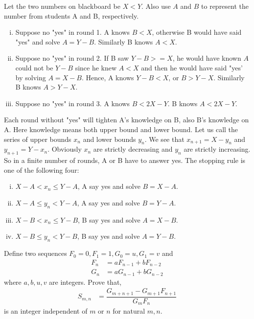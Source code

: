 \documentclass{subfile}
\begin{document}
	\begin{solution}
		Let the two numbers on blackboard be $ X<Y$. Also use $ A$ and $ B$ to represent the number from students A and B, respectively.
			\begin{enumerate}[i.]
				\item Suppose no "yes" in round 1. A knows $ B<X$, otherwise B would have said "yes" and solve $ A=Y-B$. Similarly B knows $ A<X$.
				\item Suppose no "yes" in round 2. If B saw $ Y-B>=X$, he would have known $ A$ could not be $ Y-B$ since he knew $ A<X$ and then he would have said "yes' by solving $ A=X-B$. Hence, A knows $ Y-B<X$, or $ B>Y-X$. Similarly B knows $ A>Y-X$.
				\item Suppose no "yes" in round 3. A knows $ B<2X-Y$. B knows $ A<2X-Y$.
			\end{enumerate}
		Each round without "yes" will tighten A's knowledge on B, also B's knowledge on A. Here knowledge means both upper bound and lower bound. Let us call the series of upper bounds $ x_n$ and lower bounds $ y_n$. We see that $ x_{n+1}=X-y_n$ and $ y_{n+1}=Y-x_n$. Obviously $ x_n$ are strictly decreasing and $ y_n$ are strictly increasing. So in a finite number of rounds, A or B have to answer yes. The stopping rule is one of the following four:
			\begin{enumerate}[i.]
				\item $ X-A<x_n\leq Y-A$, A say yes and solve $ B=X-A$.
				\item $ X-A\leq y_n<Y-A$, A say yes and solve $ B=Y-A$.
				\item $ X-B<x_n\leq Y-B$, B say yes and solve $ A=X-B$.
				\item $ X-B\leq y_n<Y-B$, B say yes and solve $ A=Y-B$.
			\end{enumerate}
	\end{solution}
	
	\begin{problem}
		Define two sequences $F_0=0,F_1=1,G_0=u,G_1=v$ and
			\begin{align*}
				F_n & = aF_{n-1}+bF_{n-2}\\
				G_n & = aG_{n-1}+bG_{n-2}
			\end{align*}
		where $a,b,u,v$ are integers. Prove that,
			\begin{align*}
				S_{m,n} & = \dfrac{G_{m+n+1}-G_{m+1}F_{n+1}}{G_mF_n}
			\end{align*}
		is an integer independent of $m$ or $n$ for natural $m,n$.
	\end{problem}
	
\end{document}
